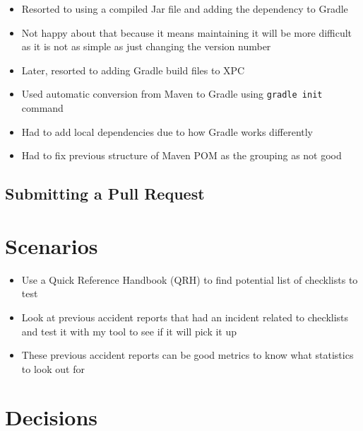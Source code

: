 \documentclass[../dissertation.tex]{subfiles}
\begin{document}
\begin{itemize}
\item Resorted to using a compiled Jar file and adding the dependency to Gradle
\item Not happy about that because it means maintaining it will be more difficult as
  it is not as simple as just changing the version number
\item Later, resorted to adding Gradle build files to XPC
\item Used automatic conversion from Maven to Gradle using \lstinline|gradle init| command~\cite{gradle:migratePOM}
\item Had to add local dependencies due to how Gradle works differently
\item Had to fix previous structure of Maven POM as the grouping as not good
\end{itemize}


\subsection{Submitting a Pull Request}




\section{Scenarios}
\begin{itemize}
  \item Use a Quick Reference Handbook (QRH) to find potential list of checklists to test
  \item Look at previous accident reports that had an incident related to checklists
    and test it with my tool to see if it will pick it up
  \item These previous accident reports can be good metrics to know what statistics to
    look out for
\end{itemize}


\section{Decisions}
\end{document}
